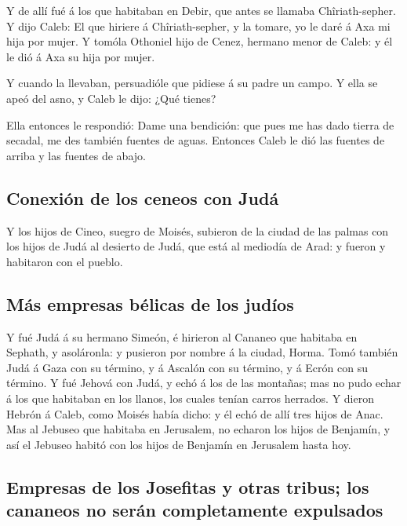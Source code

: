  Y de allí fué á los que habitaban en Debir, que antes se
llamaba Chîriath-sepher.  Y dijo Caleb: El que hiriere á
Chîriath-sepher, y la tomare, yo le daré á Axa mi hija por mujer.
 Y tomóla Othoniel hijo de Cenez, hermano menor de Caleb: y
él le dió á Axa su hija por mujer.

 Y cuando la llevaban, persuadióle que pidiese á su padre
un campo. Y ella se apeó del asno, y Caleb le dijo: ¿Qué tienes?

 Ella entonces le respondió: Dame una bendición: que pues
me has dado tierra de secadal, me des también fuentes de aguas. Entonces
Caleb le dió las fuentes de arriba y las fuentes de abajo.

\hypertarget{conexiuxf3n-de-los-ceneos-con-juduxe1}{%
\subsection{Conexión de los ceneos con
Judá}\label{conexiuxf3n-de-los-ceneos-con-juduxe1}}

 Y los hijos de Cineo, suegro de Moisés, subieron de la
ciudad de las palmas con los hijos de Judá al desierto de Judá, que está
al mediodía de Arad: y fueron y habitaron con el pueblo.

\hypertarget{muxe1s-empresas-buxe9licas-de-los-juduxedos}{%
\subsection{Más empresas bélicas de los
judíos}\label{muxe1s-empresas-buxe9licas-de-los-juduxedos}}

 Y fué Judá á su hermano Simeón, é hirieron al Cananeo que
habitaba en Sephath, y asoláronla: y pusieron por nombre á la ciudad,
Horma.  Tomó también Judá á Gaza con su término, y á
Ascalón con su término, y á Ecrón con su término.  Y fué
Jehová con Judá, y echó á los de las montañas; mas no pudo echar á los
que habitaban en los llanos, los cuales tenían carros herrados.
 Y dieron Hebrón á Caleb, como Moisés había dicho: y él
echó de allí tres hijos de Anac.  Mas al Jebuseo que
habitaba en Jerusalem, no echaron los hijos de Benjamín, y así el
Jebuseo habitó con los hijos de Benjamín en Jerusalem hasta hoy.

\hypertarget{empresas-de-los-josefitas-y-otras-tribus-los-cananeos-no-seruxe1n-completamente-expulsados}{%
\subsection{Empresas de los Josefitas y otras tribus; los cananeos no
serán completamente
expulsados}\label{empresas-de-los-josefitas-y-otras-tribus-los-cananeos-no-seruxe1n-completamente-expulsados}}

